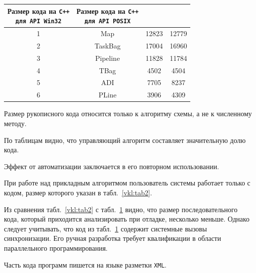 \begin{table}[p!]
\begin{tabular}{c|c|c|c}
\cbox{\footnotesize Размер кода  на \tt C++ \\ \footnotesize для \tt API Win32} & 

\cbox{\footnotesize Размер кода на \tt C++ \\ \footnotesize  для \tt API POSIX}\\

\hline

\rule{0mm}{12pt}%

1 & Map & 12823 & 12779\\

2 & TaskBag & 17004 & 16960\\

3 & Pipeline & 11828 & 11784\\

4 & TBag & \phantom{0}4502 & \phantom{0}4504\\

5 & ADI & \phantom{0}7705 & \phantom{0}8237\\

6 & PLine & \phantom{0}3906 & \phantom{0}4309\\

\hline

\end{tabular} \label{vkl:tab3}

\end{table}





Размер рукописного кода относится только к алгоритму схемы, а не к численному методу. 

По таблицам видно, что управляющий алгоритм составляет значительную долю кода. 

Эффект от автоматизации заключается в его повторном использовании.



При работе над прикладным алгоритмом пользователь системы работает только с кодом, размер которого указан в  табл.~\ref{vkl:tab2}. 

Из сравнения табл.~\ref{vkl:tab2} с табл.~\ref{vkl:tab3} видно, что размер последовательного кода, который приходится анализировать при отладке, несколько меньше. Однако следует учитывать, что код из табл.~\ref{vkl:tab3} содержит системные вызовы синхронизации. Его ручная разработка требует квалификации в области параллельного программирования.





Часть кода программ пишется на языке разметки {\tt XML}. 

